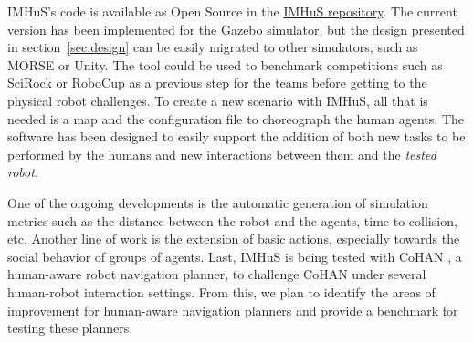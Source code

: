IMHuS's code is available as Open Source in the  \href{https://github.com/LAAS-HRI/IMHuS}{IMHuS repository}. The current version has been implemented for the Gazebo simulator, but the design presented in section~\ref{sec:design} can be easily migrated to other simulators, such as MORSE or Unity. The tool could be used to benchmark competitions such as SciRock or RoboCup as a previous step for the teams before getting to the physical robot challenges. To create a new scenario with IMHuS, all that is needed is a map and the configuration file to choreograph the human agents. The software has been designed to easily support the addition of both new tasks to be performed by the humans and new interactions between them and the \textit{tested robot}.

One of the ongoing developments is the automatic generation of simulation metrics such as the distance between the robot and the agents, time-to-collision, etc. Another line of work is the extension of basic actions, especially towards the social behavior of groups of agents. Last, IMHuS is being tested with CoHAN \cite{singamaneni2021human}, a human-aware robot navigation planner, to challenge CoHAN under several human-robot interaction settings. From this, we plan to identify the areas of improvement for human-aware navigation planners and provide a benchmark for testing these planners.
